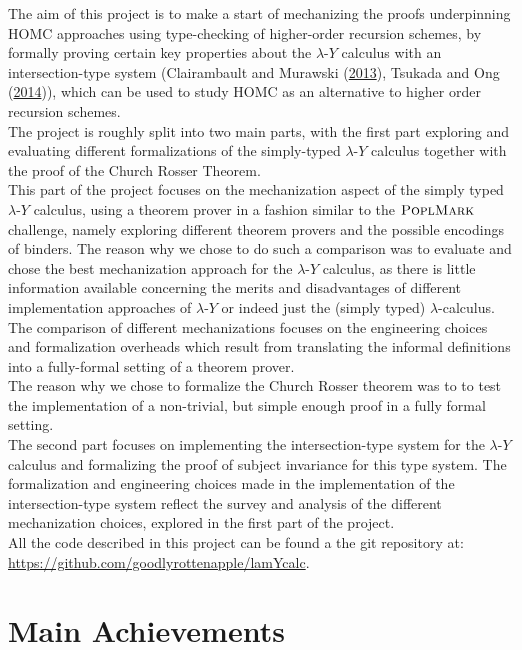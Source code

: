 \documentclass[a4paper, 12pt, twoside]{style/ociamthesis}
\theoremstyle{plain}
\theoremstyle{definition}
\theoremstyle{remark}
\newcommand{\lamy}{\lambda\text{-}Y}
\newcommand{\poplm}{\textsc{PoplMark}}
\begin{document}
The aim of this project is to make a start of mechanizing the proofs
underpinning HOMC approaches using type-checking of higher-order
recursion schemes, by formally proving certain key properties about the
\(\lamy\) calculus with an intersection-type system (Clairambault and
Murawski (\protect\hyperlink{ref-clairambault13}{2013}), Tsukada and Ong
(\protect\hyperlink{ref-tsukada14}{2014})), which can be used to study
HOMC as an alternative to higher order recursion schemes.\\
The project is roughly split into two main parts, with the first part
exploring and evaluating different formalizations of the simply-typed
\(\lamy\) calculus together with the proof of the Church Rosser
Theorem.\\
This part of the project focuses on the mechanization aspect of the
simply typed \(\lamy\) calculus, using a theorem prover in a fashion
similar to the \(\poplm\) challenge, namely exploring different theorem
provers and the possible encodings of binders. The reason why we chose
to do such a comparison was to evaluate and chose the best mechanization
approach for the \(\lamy\) calculus, as there is little information
available concerning the merits and disadvantages of different
implementation approaches of \(\lamy\) or indeed just the (simply typed)
\(\lambda\)-calculus. The comparison of different mechanizations focuses
on the engineering choices and formalization overheads which result from
translating the informal definitions into a fully-formal setting of a
theorem prover.\\
The reason why we chose to formalize the Church Rosser theorem was to to
test the implementation of a non-trivial, but simple enough proof in a
fully formal setting.\\
The second part focuses on implementing the intersection-type system for
the \(\lamy\) calculus and formalizing the proof of subject invariance
for this type system. The formalization and engineering choices made in
the implementation of the intersection-type system reflect the survey
and analysis of the different mechanization choices, explored in the
first part of the project.\\
All the code described in this project can be found a the git repository
at: \url{https://github.com/goodlyrottenapple/lamYcalc}.

\section{Main Achievements}\label{main-achievements}
\end{document}
